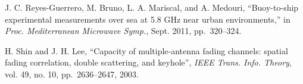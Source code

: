\documentclass[conference]{IEEEtran}
\begin{document}
\begin{thebibliography}{10}
J. C. Reyes-Guerrero, M. Bruno, L. A. Mariscal, and A. Medouri, ``Buoy-to-ship experimental measurements over sea at 5.8 GHz near urban environments,'' in
\emph{Proc. Mediterranean Microwave Symp.}, Sept. 2011, pp.~320--324.



  H. Shin and J. H. Lee, ``Capacity of multiple-antenna fading channels: spatial fading correlation, double scattering, and keyhole'',
  \emph{IEEE Trans. Info. Theory}, vol. 49, no. 10, pp.~2636--2647, 2003.






\end{thebibliography}
\end{document}
